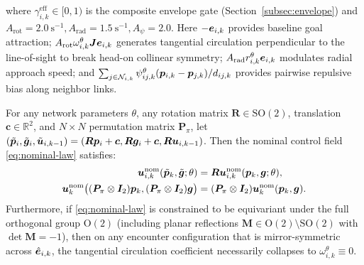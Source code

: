 where $\gamma_{i,k}^{\mathrm{eff}}\in[0,1)$ is the composite envelope gate (Section~\ref{subsec:envelope}) and $A_{\mathrm{rot}}=2.0\ \mathrm s^{-1},A_{\mathrm{rad}}=1.5\ \mathrm s^{-1},A_\psi=2.0$. Here $-\boldsymbol{e}_{i,k}$ provides baseline goal attraction; $A_{\mathrm{rot}}\omega_{i,k}^\theta\boldsymbol{J}\boldsymbol{e}_{i,k}$ generates tangential circulation perpendicular to the line-of-sight to break head-on collinear symmetry; $A_{\mathrm{rad}}r_{i,k}^\theta\boldsymbol{e}_{i,k}$ modulates radial approach speed; and $\sum_{j\in\mathcal N_{i,k}}\psi_{ij,k}^\theta(\boldsymbol{p}_{i,k}-\boldsymbol{p}_{j,k})/d_{ij,k}$ provides pairwise repulsive bias along neighbor links.

\begin{proposition}\label{prop:equivariance}
For any network parameters $\theta$, any rotation matrix $\boldsymbol R\in\mathrm{SO}(2)$, translation $\boldsymbol c\in\mathbb R^2$, and $N\times N$ permutation matrix $\boldsymbol P_\pi$, let $(\tilde{\boldsymbol{p}}_i,\tilde{\boldsymbol{g}}_i,\tilde{\boldsymbol{u}}_{i,k-1})=(\boldsymbol R\boldsymbol{p}_i+\boldsymbol c,\boldsymbol R\boldsymbol{g}_i+\boldsymbol c,\boldsymbol R\boldsymbol{u}_{i,k-1})$. Then the nominal control field \eqref{eq:nominal-law} satisfies:
\begin{equation}
\begin{split}
 \boldsymbol{u}_{i,k}^{\mathrm{nom}}(\tilde{\boldsymbol{p}}_k,\tilde{\boldsymbol{g}};\theta)&=\boldsymbol R\boldsymbol{u}_{i,k}^{\mathrm{nom}}(\boldsymbol{p}_k,\boldsymbol{g};\theta),\\
 \boldsymbol{u}_k^{\mathrm{nom}}\big((\boldsymbol P_\pi\otimes\boldsymbol{I}_2)\boldsymbol{p}_k,(\boldsymbol P_\pi\otimes\boldsymbol{I}_2)\boldsymbol{g}\big)&=(\boldsymbol P_\pi\otimes\boldsymbol{I}_2)\boldsymbol{u}_k^{\mathrm{nom}}(\boldsymbol{p}_k,\boldsymbol{g}).
\end{split}\label{eq:equiv-prop}
\end{equation}
Furthermore, if \eqref{eq:nominal-law} is constrained to be equivariant under the full orthogonal group $\mathrm{O}(2)$ (including planar reflections $\boldsymbol M\in\mathrm{O}(2)\setminus\mathrm{SO}(2)$ with $\det\boldsymbol M=-1$), then on any encounter configuration that is mirror-symmetric across $\hat{\boldsymbol{e}}_{i,k}$, the tangential circulation coefficient necessarily collapses to $\omega_{i,k}^\theta\equiv 0$.
\end{proposition}
